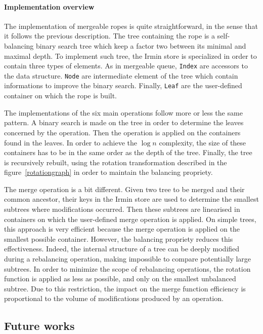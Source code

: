 \documentclass{article}
\renewcommand{\-}{\hyp}
\newcommand{\irmin}{Irmin\xspace}
\newcommand{\code}[1]{\texttt{#1}}
\begin{document}
\paragraph{Implementation overview}
The implementation of mergeable ropes is quite straightforward, in the sense that it follows the previous description.
The tree containing the rope is a self-balancing binary search tree which keep a factor two between its minimal and maximal depth.
To implement such tree, the \irmin store is specialized in order to contain three types of elements.
As in mergeable queue, \code{Index} are accessors to the data structure.
\code{Node} are intermediate element of the tree which contain informations to improve the binary search.
Finally, \code{Leaf} are the user-defined container on which the rope is built.

The implementations of the six main operations follow more or less the same pattern.
A binary search is made on the tree in order to determine the leaves concerned by the operation.
Then the operation is applied on the containers found in the leaves.
In order to achieve the $\log n$ complexity, the size of these containers has to be in the same order as the depth of the tree.
Finally, the tree is recursively rebuilt, using the rotation transformation described in the figure~\ref{rotationgraph} in order to maintain the balancing propriety.

The merge operation is a bit different.
Given two tree to be merged and their common ancestor, their keys in the \irmin store are used to determine the smallest subtrees where modifications occurred.
Then these subtrees are linearised in containers on which the user-defined merge operation is applied.
On simple trees, this approach is very efficient because the merge operation is applied on the smallest possible container.
However, the balancing propriety reduces this effectiveness.
Indeed, the internal structure of a tree can be deeply modified during a rebalancing operation, making impossible to compare potentially large subtrees.
In order to minimize the scope of rebalancing operations, the rotation function is applied as less as possible, and only on the smallest unbalanced subtree.
Due to this restriction, the impact on the merge function efficiency is proportional to the volume of modifications produced by  an operation.

\subsection{Future works}
\end{document}
